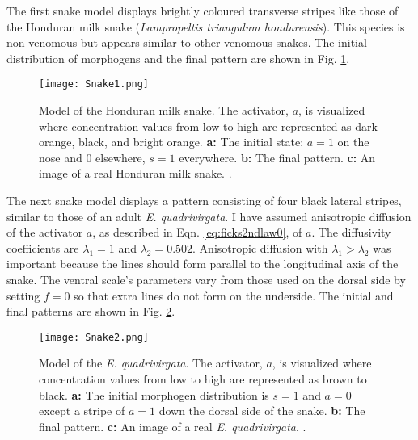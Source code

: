 \newpage
The first snake model displays brightly coloured transverse stripes like those of the Honduran milk snake (\textit{Lampropeltis triangulum hondurensis}). This species is non-venomous but appears similar to other venomous snakes. The initial distribution of morphogens and the final pattern are shown in Fig. \ref{fig:Snake1}.

\begin{figure}[ht]
	\centering
	\texttt{[image: Snake1.png]}
	\caption[Model of the Honduran milk snake]{Model of the Honduran milk snake. The activator, $a$, is visualized where concentration values from low to high are represented as dark orange, black, and bright orange. \textbf{a:} The initial state: $a=1$ on the nose and $0$ elsewhere, $s=1$ everywhere. \textbf{b:} The final pattern. \textbf{c:} An image of a real Honduran milk snake. .}
	\label{fig:Snake1}
\end{figure}

The next snake model displays a pattern consisting of four black lateral stripes, similar to those of an adult \textit{E. quadrivirgata}. I have assumed anisotropic diffusion of the activator $a$, as described in Eqn. \ref{eq:ficks2ndlaw0}, of $a$. The diffusivity coefficients are $\lambda_{1}=1$ and $\lambda_{2}=0.502$. Anisotropic diffusion with $\lambda_{1} > \lambda_{2}$ was important because the lines should form parallel to the longitudinal axis of the snake. The ventral scale's parameters vary from those used on the dorsal side by setting $f=0$ so that extra lines do not form on the underside. The initial and final patterns are shown in Fig. \ref{fig:Snake2}.

\begin{figure}[ht]
	\centering
	\texttt{[image: Snake2.png]}
	\caption[Model of the \textit{E. quadrivirgata}]{Model of the \textit{E. quadrivirgata}. The activator, $a$, is visualized where concentration values from low to high are represented as brown to black. \textbf{a:} The initial morphogen distribution is $s=1$ and $a=0$ except a stripe of $a=1$ down the dorsal side of the snake. \textbf{b:} The final pattern. \textbf{c:} An image of a real \textit{E. quadrivirgata}. .}
	\label{fig:Snake2}
\end{figure}

\newpage

